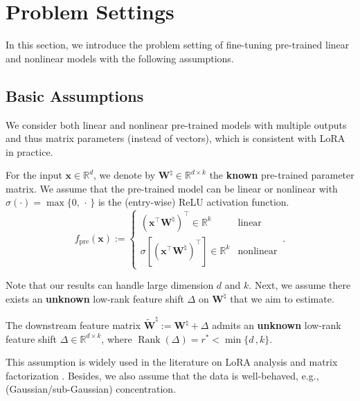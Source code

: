 \section{Problem Settings}
\label{sec:problsemsetting}
In this section, we introduce the problem setting of fine-tuning pre-trained linear and nonlinear models with the following assumptions. 


\subsection{Basic Assumptions}
\label{sec:assumptions}

We consider both linear and nonlinear pre-trained models with multiple outputs and thus matrix parameters (instead of vectors), which is consistent with LoRA in practice.
\begin{assumption}
\label{assum:pre-trained-model}
    For the input $\bm x \in \mathbb{R}^d$, we denote by $\bm W^\natural \in \mathbb{R}^{d \times k}$ the {\bf known} pre-trained parameter matrix. We assume that the pre-trained model can be linear or nonlinear with $\sigma(\cdot) = \max\{0, \,\cdot\,\}$ is the (entry-wise) ReLU activation function.
    \[
f_\text{pre}\left(\bm x\right) := 
\begin{cases}
( \bm x^{\!\top} \bm W^\natural)^{\!\top} \in \mathbb{R}^k & \text{linear} \\ 
\sigma [(\bm x^{\!\top} \bm W^\natural)^{\!\top} ] \in \mathbb{R}^k & \text{nonlinear}
\end{cases}\,.
\]
\end{assumption}
Note that our results can handle large dimension $d$ and $k$.
Next, we assume there exists an {\bf unknown} low-rank feature shift $\Delta$ on ${\bm W}^\natural$ that we aim to estimate.
\begin{assumption}
\label{assum:downstream-delta}
The downstream feature matrix $\widetilde{\bm W}^\natural:={\bm W}^\natural+\Delta$ admits an {\bf unknown} low-rank feature shift  $\Delta\in\mathbb{R}^{d\times k}$, where  $\operatorname{Rank}\left(\Delta\right)=r^* < \min \{d\,,k\}$.  
\end{assumption}
This assumption is widely used in the literature on LoRA analysis and matrix factorization \citep{zhang2021preconditioned,stoger2021small,soltanolkotabi2023implicit,xiong2023over}. Besides, we also assume that the data is well-behaved, e.g., (Gaussian/sub-Gaussian) concentration. 

